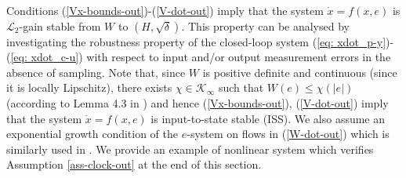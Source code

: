 \documentclass[a4paper, 9pt, twocolumn]{IEEEtran}
\theoremstyle{plain}
\theoremstyle{definition}
\newcommand{\Kinf}{\ensuremath{\mathcal{K}_{\infty}}}
\begin{document}
Conditions (\ref{Vx-bounds-out})-(\ref{V-dot-out}) imply that the system $\dot{x} = f(x,e)$ is $\mathcal{L}_{2}$-gain stable from $W$ to $(H,\sqrt{\delta})$. This property can be analysed by investigating the robustness property of the closed-loop system (\ref{eq: xdot_p-y})-(\ref{eq: xdot_c-u}) with respect to input and/or output measurement errors in the absence of sampling. Note that, since $W$ is positive definite and continuous (since it is locally Lipschitz), there exists $\chi\in\Kinf$ such that $W(e) \leq \chi(|e|)$ (according to Lemma 4.3 in \cite{Khalil}) and hence (\ref{Vx-bounds-out}), (\ref{V-dot-out}) imply that the system $\dot{x}=f(x,e)$ is input-to-state stable (ISS). We also assume an exponential growth condition of the $e$-system on flows in (\ref{W-dot-out}) which is similarly used in \cite{Nesic2009explicit}. We provide an example of nonlinear system which verifies Assumption \ref{ass-clock-out} at the end of this section.
\end{document}
